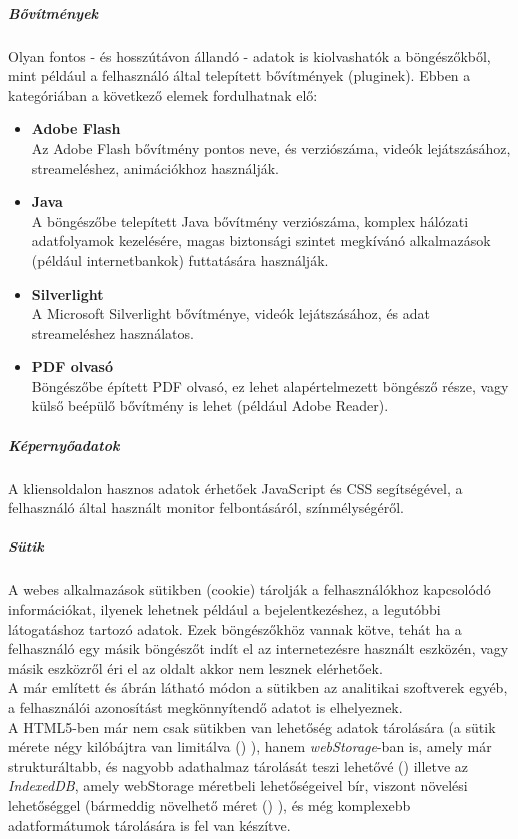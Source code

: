 \subparagraph{Bővítmények} %
\label{subp:bővítmények}
Olyan fontos - és hosszútávon állandó - adatok is kiolvashatók a böngészőkből, mint például a felhasználó által telepített bővítmények (pluginek). Ebben a kategóriában a következő elemek fordulhatnak elő:
\begin{itemize}
	\item{\textbf{Adobe Flash}}\hfill\\ 
		Az Adobe Flash bővítmény pontos neve, és verziószáma, videók lejátszásához, streameléshez, animációkhoz használják.
		
	\item{\textbf{Java}}\hfill\\ 
		A böngészőbe telepített Java bővítmény verziószáma, komplex hálózati adatfolyamok kezelésére, magas biztonsági szintet megkívánó alkalmazások (például internetbankok) futtatására használják.
	\item{\textbf{Silverlight}}\hfill\\ 
		A Microsoft Silverlight bővítménye, videók lejátszásához, és adat streameléshez használatos.
		
	\item{\textbf{PDF olvasó}}\hfill\\ 
		Böngészőbe épített PDF olvasó, ez lehet alapértelmezett böngésző része, vagy külső beépülő bővítmény is lehet (például Adobe Reader).
\end{itemize}

\subparagraph{Képernyőadatok} %
\label{subp:képernyőadatok}
A kliensoldalon hasznos adatok érhetőek JavaScript és CSS segítségével, a felhasználó által használt monitor felbontásáról, színmélységéről.

\subparagraph{Sütik} %
\label{subp:sütik}
A webes alkalmazások sütikben (cookie) tárolják a felhasználókhoz kapcsolódó információkat, ilyenek lehetnek például a bejelentkezéshez, a legutóbbi látogatáshoz tartozó adatok. Ezek böngészőkhöz vannak kötve, tehát ha a felhasználó egy másik böngészőt indít el az internetezésre használt eszközén, vagy másik eszközről éri el az oldalt akkor nem lesznek elérhetőek.\hfill\\
A már említett és  ábrán látható módon a sütikben az analitikai szoftverek egyéb, a felhasználói azonosítást megkönnyítendő adatot is elhelyeznek.\hfill\\
A HTML5-ben már nem csak sütikben van lehetőség adatok tárolására (a sütik mérete négy kilóbájtra van limitálva (\cite{msdn_cookie}) ), hanem \textit{webStorage}-ban is, amely már strukturáltabb, és nagyobb adathalmaz tárolását teszi lehetővé (\cite{webstorage}) illetve az \textit{IndexedDB}, amely webStorage méretbeli lehetőségeivel bír, viszont növelési lehetőséggel (bármeddig növelhető 
méret (\cite{mdn_indexeddb}) ), és még komplexebb adatformátumok tárolására is fel van készítve. 

